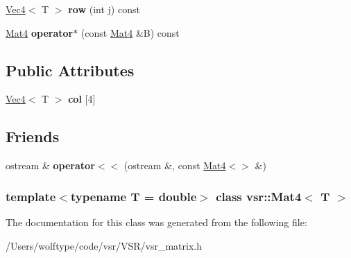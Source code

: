 \begin{DoxyCompactItemize}
\item 
\hypertarget{classvsr_1_1_mat4_a6412982a67fec2edc0220515dd9ad550}{\hyperlink{classvsr_1_1_vec4}{Vec4}$<$ T $>$ {\bfseries row} (int j) const }\label{classvsr_1_1_mat4_a6412982a67fec2edc0220515dd9ad550}

\item 
\hypertarget{classvsr_1_1_mat4_a8185e65acadc51c1a4f25f01914fe623}{\hyperlink{classvsr_1_1_mat4}{Mat4} {\bfseries operator$\ast$} (const \hyperlink{classvsr_1_1_mat4}{Mat4} \&B) const }\label{classvsr_1_1_mat4_a8185e65acadc51c1a4f25f01914fe623}

\end{DoxyCompactItemize}
\subsection*{Public Attributes}
\begin{DoxyCompactItemize}
\item 
\hypertarget{classvsr_1_1_mat4_a96e27d3a109bf12f84eaafab4814d7a5}{\hyperlink{classvsr_1_1_vec4}{Vec4}$<$ T $>$ {\bfseries col} \mbox{[}4\mbox{]}}\label{classvsr_1_1_mat4_a96e27d3a109bf12f84eaafab4814d7a5}

\end{DoxyCompactItemize}
\subsection*{Friends}
\begin{DoxyCompactItemize}
\item 
\hypertarget{classvsr_1_1_mat4_a809a98962d985057e008db1b2eb22a48}{ostream \& {\bfseries operator$<$$<$} (ostream \&, const \hyperlink{classvsr_1_1_mat4}{Mat4}$<$$>$ \&)}\label{classvsr_1_1_mat4_a809a98962d985057e008db1b2eb22a48}

\end{DoxyCompactItemize}
\subsubsection*{template$<$typename T = double$>$ class vsr\-::\-Mat4$<$ T $>$}



The documentation for this class was generated from the following file\-:\begin{DoxyCompactItemize}
\item 
/\-Users/wolftype/code/vsr/\-V\-S\-R/vsr\-\_\-matrix.\-h\end{DoxyCompactItemize}

